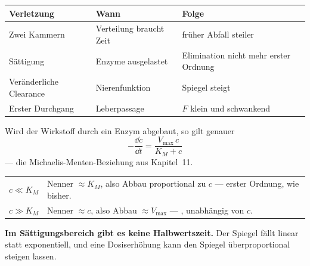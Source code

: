 \begin{warnung}
\begin{center}
{\small
\renewcommand{\arraystretch}{1.5}
\begin{tabular}{@{}P{2.4cm}P{3.0cm}P{2.8cm}@{}}
\toprule
\textbf{Verletzung} & \textbf{Wann} & \textbf{Folge}\\
\midrule
Zwei Kammern & Verteilung braucht Zeit & früher Abfall steiler\\
Sättigung & Enzyme ausgelastet & \textcolor{akzent}{Elimination nicht mehr erster Ordnung}\\
Veränderliche Clearance & Nierenfunktion & Spiegel steigt\\
Erster Durchgang & Leberpassage & $F$ klein und schwankend\\
\bottomrule
\end{tabular}}
\end{center}

Wird der Wirkstoff durch ein Enzym abgebaut, so gilt genauer
\[ -\frac{\dd c}{\dd t} = \frac{V_{\max}\,c}{K_M + c} \]
--- die Michaelis-Menten-Beziehung aus Kapitel~11.

\begin{center}
\renewcommand{\arraystretch}{1.5}
\begin{tabular}{@{}P{2.4cm}P{6.2cm}@{}}
\toprule
$c \ll K_M$ & Nenner $\approx K_M$, also Abbau proportional zu $c$ --- erster Ordnung, wie bisher.\\
$c \gg K_M$ & Nenner $\approx c$, also Abbau $\approx V_{\max}$ --- , unabhängig von $c$.\\
\bottomrule
\end{tabular}
\end{center}

\begin{center}
\begin{minipage}{0.9\textwidth}
\textbf{Im Sättigungsbereich gibt es keine Halbwertszeit.} Der Spiegel fällt linear statt exponentiell, und eine Dosiserhöhung kann den Spiegel überproportional steigen lassen.
\end{minipage}
\end{center}

\begin{center}
\begin{minipage}{0.88\textwidth}
\end{minipage}
\end{center}
\end{warnung}

